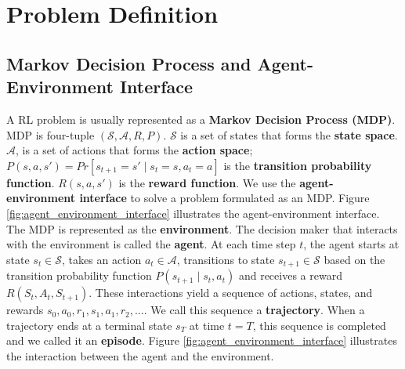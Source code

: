 \chapter{Problem Definition}

\section{Markov Decision Process and Agent-Environment Interface} \label{sec:markov}
A RL problem is usually represented as a \textbf{Markov Decision Process (MDP)}.
MDP is four-tuple $(\mathcal{S}, \mathcal{A}, R, P)$.
$\mathcal{S}$ is a set of states that forms the \textbf{state space}.
$\mathcal{A}$, is a set of actions that forms the \textbf{action space};
$P(s, a, s') = Pr[ s_{t+1} = s' \mid  s_t = s, a_t = a]$ is the \textbf{transition probability function}.
$R(s, a, s')$ is the \textbf{reward function}.
We use the \textbf{agent-environment interface} to solve a problem formulated as an MDP.
Figure \ref{fig:agent_environment_interface} illustrates the agent-environment interface.
The MDP is represented as the \textbf{environment}.
The decision maker that interacts with the environment is called the \textbf{agent}.
At each time step $t$, the agent starts at state $s_t \in \mathcal{S}$, takes an action $a_t \in \mathcal{A}$,
transitions to state $s_{t+1} \in \mathcal{S}$ based on the transition probability function $P(s_{t+1} \mid s_t, a_t)$
and receives a reward $R(S_t, A_t, S_{t+1})$.
These interactions yield a sequence of actions, states, and rewards $s_{0}, a_{0}, r_{1}, s_{1}, a_{1}, r_{2}, \dots$.
We call this sequence a \textbf{trajectory}.
When a trajectory ends at a terminal state $s_T$ at time $t = T$, this sequence is completed and we called it an \textbf{episode}.
Figure \ref{fig:agent_environment_interface} illustrates the interaction between the agent and the environment.



